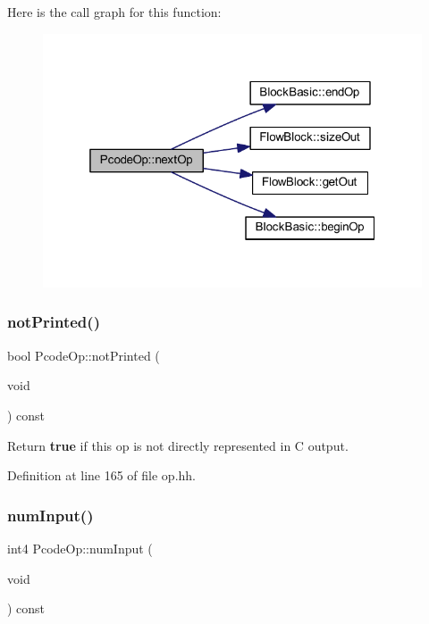 Here is the call graph for this function\+:
\nopagebreak
\begin{figure}[H]
\begin{center}
\leavevmode
\includegraphics[width=319pt]{class_pcode_op_a6d5fd39f58bea087491f7d86250b0165_cgraph}
\end{center}
\end{figure}
\mbox{\label{class_pcode_op_aaef20aa623203d9c4a4dcae10ff48be0}} 
\subsubsection{\texorpdfstring{notPrinted()}{notPrinted()}}
{\footnotesize\ttfamily bool Pcode\+Op\+::not\+Printed (\begin{DoxyParamCaption}\item[{void}]{ }\end{DoxyParamCaption}) const\hspace{0.3cm}{\ttfamily [inline]}}



Return {\bfseries{true}} if this op is not directly represented in C output. 



Definition at line 165 of file op.\+hh.

\mbox{\label{class_pcode_op_a71129a0986d769b189aec8ea80046fbd}} 
\subsubsection{\texorpdfstring{numInput()}{numInput()}}
{\footnotesize\ttfamily int4 Pcode\+Op\+::num\+Input (\begin{DoxyParamCaption}\item[{void}]{ }\end{DoxyParamCaption}) const\hspace{0.3cm}{\ttfamily [inline]}}



